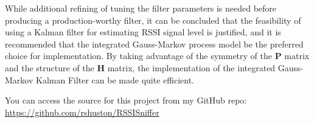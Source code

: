 \documentclass[12pt]{article}
\begin{document}
\clearpage

While additional refining of tuning the filter parameters is needed before producing a
production-worthy filter, it can be concluded that the feasibility of using a Kalman
filter for estimating RSSI signal level is justified, and it is recommended that the
integrated Gauss-Markov process model be the preferred choice for implementation. By
taking advantage of the symmetry of the $\mathbf{P}$ matrix and the structure of the
$\mathbf{H}$ matrix, the implementation of the integrated Gauss-Markov Kalman Filter
can be made quite efficient.

You can access the source for this project from my GitHub repo: \\
\textcolor{blue}{\url{https://github.com/rshuston/RSSISniffer}}



%
%

\clearpage

\renewcommand{\refname}{General References}
\end{document}
